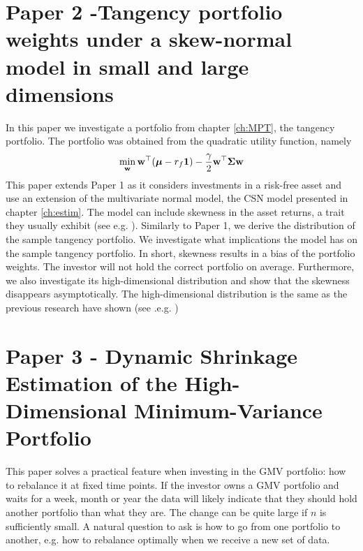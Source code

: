 \documentclass[oneside]{book}\usepackage{knitr}
\begin{document}
\section{Paper 2 -Tangency portfolio weights under a skew-normal model in small and large dimensions}\label{sec:paper2}
In this paper we investigate a portfolio from chapter \ref{ch:MPT}, the tangency portfolio. 
The portfolio was obtained from the quadratic utility function, namely
\begin{equation}
  \min_{\mathbf{w}} \mathbf{w}^\top (\mbox{\boldmath$\mu$} -r_f\mathbf{1}) - \frac{\gamma}{2} \mathbf{w}^\top \mathbf{\Sigma} \mathbf{w}
\end{equation}
This paper extends Paper 1 as it considers investments in a risk-free asset and use an extension of the multivariate normal model, the CSN model presented in chapter \ref{ch:estim}. 
The model can include skewness in the asset returns, a trait they usually exhibit (see e.g. \citet{cont2001empirical}). 
Similarly to Paper 1, we derive the distribution of the sample tangency portfolio.
We investigate what implications the model has on the sample tangency portfolio.
In short, skewness results in a bias of the portfolio weights. 
The investor will not hold the correct portfolio on average.
Furthermore, we also investigate its high-dimensional distribution and show that the skewness disappears asymptotically. 
The high-dimensional distribution is the same as the previous research have shown (see .e.g. \citet{karlsson2021statistical})

\section{Paper 3 - Dynamic Shrinkage Estimation of the High-Dimensional Minimum-Variance Portfolio}\label{sec:paper3}
This paper solves a practical feature when investing in the GMV portfolio: how to rebalance it at fixed time points. 
If the investor owns a GMV portfolio and waits for a week, month or year the data will likely indicate that they should hold another portfolio than what they are.
The change can be quite large if $n$ is sufficiently small.
A natural question to ask is how to go from one portfolio to another, e.g. how to rebalance optimally when we receive a new set of data. 
\end{document}
